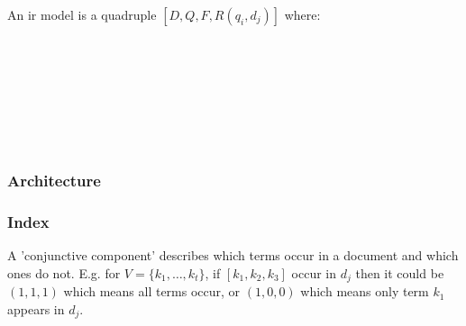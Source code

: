An \gls{ir} model is a quadruple $[D,Q,F,R(q_{i}, d_{j})]$ where:\\
 \\
 \\
 \\
\itab{}    \\
            \\
 \\
            \\
\itab{}     



\subsubsection*{Architecture}


\subsubsection*{Index}

A 'conjunctive component' describes which terms occur in a  document and which ones do not. E.g. for $V =\{k_{1},\ldots, k_{t}\}$, if $[ k_{1},k_{2},k_{3}]$ occur in $d_{j}$ then it could be $(1,1,1)$ which means all terms occur, or $(1,0,0)$ which means only term $k_{1}$ appears in $d_{j}$.

